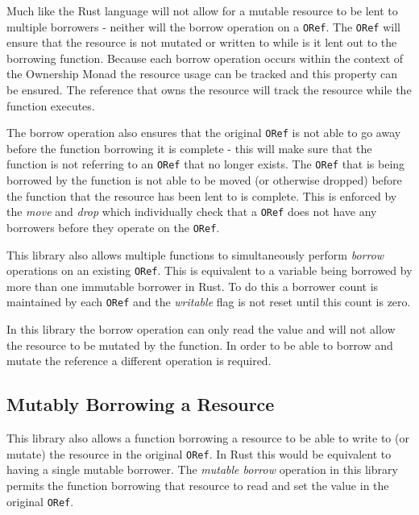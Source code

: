 \documentclass[onehalf,11pt]{beavtex}
\begin{document}
Much like the Rust language will not allow for a mutable resource to be lent to
multiple borrowers - neither will the borrow operation on a \texttt{ORef}.
The \texttt{ORef} will ensure that the resource is not mutated or written to while is it
lent out to the borrowing function. 
Because each borrow operation occurs within the context of the Ownership Monad
the resource usage can be tracked and this property can be ensured. The
reference that owns the resource will track the resource while the function
executes.

The borrow operation also ensures that the original \texttt{ORef} is not able to go away
before the function borrowing it is complete - this will make sure that the
function is not referring to an \texttt{ORef} that no longer exists.  The \texttt{ORef} that is
being borrowed by the function is not able to be moved (or otherwise dropped)
before the function that the resource has been lent to is complete. This is
enforced by the \textit{move} and \textit{drop} which individually check that
a \texttt{ORef} does not have any borrowers before they operate on the \texttt{ORef}.

This library also allows multiple functions to simultaneously perform
\textit{borrow} operations on an existing \texttt{ORef}. This is equivalent to a variable
being borrowed by more than one immutable borrower in Rust. To do this a
borrower count is maintained by each \texttt{ORef} and the \textit{writable} flag is not
reset until this count is zero.

In this library the borrow operation can only read the value and will not allow
the resource to be mutated by the function.  In order to be able to borrow and
mutate the reference a different operation is required.

\subsection{Mutably Borrowing a Resource}

This library also allows a function borrowing a resource to be able to
write to (or mutate) the resource in the original \texttt{ORef}.  In Rust this would be
equivalent to having a single mutable borrower.  The \textit{mutable borrow}
operation in this library permits the function borrowing that resource to read
and set the value in the original \texttt{ORef}.
\end{document}

